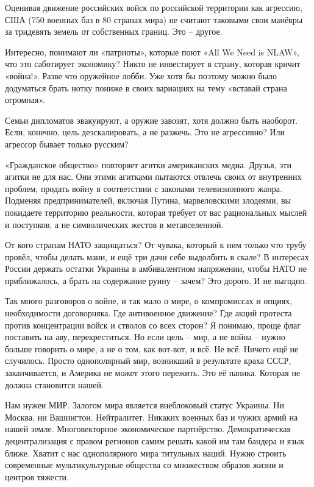 Оценивая движение российских войск по российской территории как агрессию, США
(750 военных баз в 80 странах мира) не считают таковыми свои манёвры за
тридевять земель от собственных границ. Это – другое.

Интересно, понимают ли «патриоты», которые поют «All We Need is NLAW», что это
саботирует экономику? Никто не инвестирует в страну, которая кричит «война!».
Разве что оружейное лобби. Уже хотя бы поэтому можно было додуматься брать
нотку пониже в своих вариациях на тему «вставай страна огромная».

Семьи дипломатов эвакуируют, а оружие завозят, хотя должно быть наоборот. Если,
конечно, цель деэскалировать, а не разжечь. Это не агрессивно? Или агрессор
бывает только русским?

«Гражданское общество» повторяет агитки американских медиа. Друзья, эти агитки
не для нас. Они этими агитками пытаются отвлечь своих от внутренних проблем,
продать войну в соответствии с законами телевизионного жанра. Подменяя
предпринимателей, включая Путина, марвеловскими злодеями, вы покидаете
территорию реальности, которая требует от вас рациональных мыслей и поступков,
а не символических жестов в метавселенной.

От кого странам НАТО защищаться? От чувака, который к ним только что трубу
провёл, чтобы делать мани, и ещё три дачи себе выдолбить в скале? В интересах
России держать остатки Украины в амбивалентном напряжении, чтобы НАТО не
приближалось, а брать на содержание руину – зачем? Это дорого. И не выгодно.

Так много разговоров о войне, и так мало о мире, о компромиссах и опциях,
необходимости договорняка. Где антивоенное движение? Где акций протеста против
концентрации войск и стволов со всех сторон? Я понимаю, проще флаг поставить на
аву, перекреститься. Но если цель – мир, а не война – нужно больше говорить о
мире, а не о том, как вот-вот, и всё. Не всё. Ничего ещё не случилось. Просто
однополярный мир, возникший в результате краха СССР, заканчивается, и Америка
не может этого пережить. Это её паника. Которая не должна становится нашей.

Нам нужен МИР. Залогом мира является внеблоковый статус Украины. Ни Москва, ни
Вашингтон. Нейтралитет. Никаких военных баз и чужих армий на нашей земле.
Многовекторное экономическое партнёрство. Демократическая децентрализация с
правом регионов самим решать какой им там бандера и язык ближе. Хватит с нас
однополярного мира титульных наций. Нужно строить современные мультикультурные
общества со множеством образов жизни и центров тяжести.
